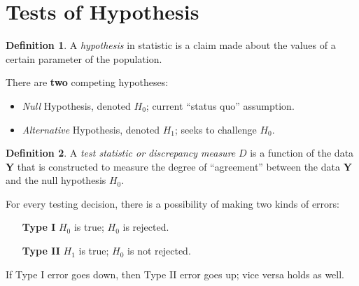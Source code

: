 \documentclass[12pt]{article}
\theoremstyle{definition}
\newtheorem*{defn}{Definition}
\begin{document}
  \section{Tests of Hypothesis}
  \begin{defn}
    A \emph{hypothesis} in statistic is a claim made about the values of a certain parameter of the population.
  \end{defn}

  There are \textbf{two} competing hypotheses:
  \begin{itemize}
    \item \emph{Null} Hypothesis, denoted $H_{0}$; current ``status quo'' assumption.
    \item \emph{Alternative} Hypothesis, denoted $H_{1}$; seeks to challenge $H_{0}$.
  \end{itemize}

  \begin{defn}
    A \emph{test statistic \emph{or} discrepancy measure} $D$ is a function of the data \textbf{Y} that is constructed to measure the degree of ``agreement'' between the data \textbf{Y} and the null hypothesis $H_{0}$.
  \end{defn}

  For every testing decision, there is a possibility of making two kinds of errors:
  \begin{itemize}
    \item[\textbf{Type I}] $H_{0}$ is true; $H_{0}$ is rejected.
    \item[\textbf{Type II}] $H_{1}$ is true; $H_{0}$ is not rejected.
  \end{itemize}
  If Type I error goes down, then Type II error goes up; vice versa holds as well.
\end{document}
